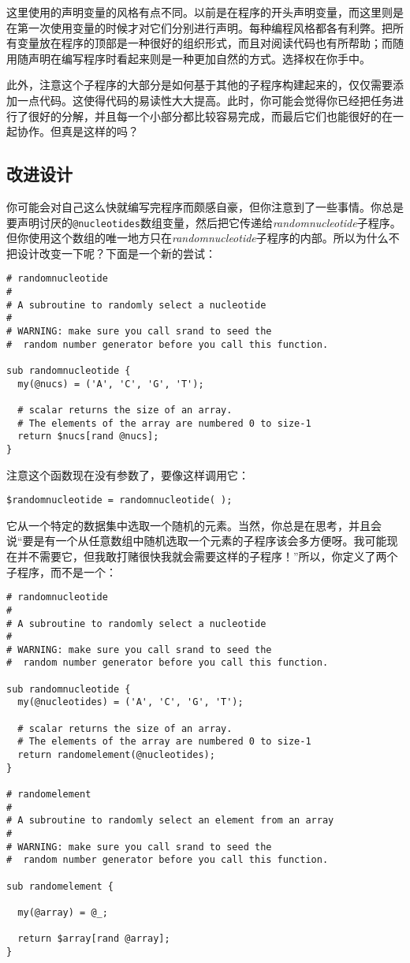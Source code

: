 这里使用的声明变量的风格有点不同。以前是在程序的开头声明变量，而这里则是在第一次使用变量的时候才对它们分别进行声明。每种编程风格都各有利弊。把所有变量放在程序的顶部是一种很好的组织形式，而且对阅读代码也有所帮助；而随用随声明在编写程序时看起来则是一种更加自然的方式。选择权在你手中。

此外，注意这个子程序的大部分是如何基于其他的子程序构建起来的，仅仅需要添加一点代码。这使得代码的易读性大大提高。此时，你可能会觉得你已经把任务进行了很好的分解，并且每一个小部分都比较容易完成，而最后它们也能很好的在一起协作。但真是这样的吗？

\subsection{改进设计}
你可能会对自己这么快就编写完程序而颇感自豪，但你注意到了一些事情。你总是要声明讨厌的\verb|@nucleotides|数组变量，然后把它传递给\textit{randomnucleotide}子程序。但你使用这个数组的唯一地方只在\textit{randomnucleotide}子程序的内部。所以为什么不把设计改变一下呢？下面是一个新的尝试：

\begin{lstlisting}
# randomnucleotide
#
# A subroutine to randomly select a nucleotide
#
# WARNING: make sure you call srand to seed the
#  random number generator before you call this function.

sub randomnucleotide {
  my(@nucs) = ('A', 'C', 'G', 'T');

  # scalar returns the size of an array. 
  # The elements of the array are numbered 0 to size-1
  return $nucs[rand @nucs];
}
\end{lstlisting}

注意这个函数现在没有参数了，要像这样调用它：

\begin{lstlisting}
$randomnucleotide = randomnucleotide( );
\end{lstlisting}

它从一个特定的数据集中选取一个随机的元素。当然，你总是在思考，并且会说“要是有一个从任意数组中随机选取一个元素的子程序该会多方便呀。我可能现在并不需要它，但我敢打赌很快我就会需要这样的子程序！”所以，你定义了两个子程序，而不是一个：

\begin{lstlisting}
# randomnucleotide
#
# A subroutine to randomly select a nucleotide
#
# WARNING: make sure you call srand to seed the
#  random number generator before you call this function.

sub randomnucleotide {
  my(@nucleotides) = ('A', 'C', 'G', 'T');

  # scalar returns the size of an array. 
  # The elements of the array are numbered 0 to size-1
  return randomelement(@nucleotides);
}

# randomelement
#
# A subroutine to randomly select an element from an array
#
# WARNING: make sure you call srand to seed the
#  random number generator before you call this function.

sub randomelement {

  my(@array) = @_;

  return $array[rand @array];
}
\end{lstlisting}

